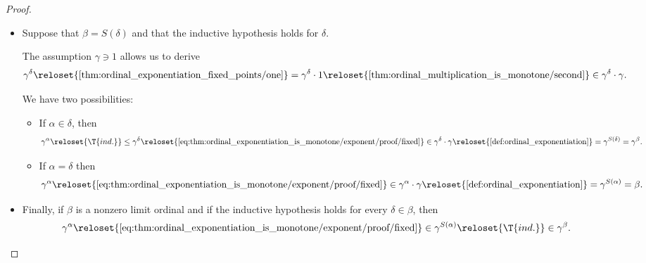 \begin{proof}
\begin{itemize}
    \item Suppose that \( \beta = S(\delta) \) and that the inductive hypothesis holds for \( \delta \).

    The assumption \( \gamma \ni 1 \) allows us to derive
    \begin{equation}\label{eq:thm:ordinal_exponentiation_is_monotone/exponent/proof/fixed}
      \gamma^\delta
      \reloset {\ref{thm:ordinal_exponentiation_fixed_points/one}} =
      \gamma^\delta \cdot 1
      \reloset {\ref{thm:ordinal_multiplication_is_monotone/second}} \in
      \gamma^\delta \cdot \gamma.
    \end{equation}

    We have two possibilities:
    \begin{itemize}
      \item If \( \alpha \in \delta \), then
      \begin{equation*}
        \gamma^\alpha
        \reloset {\T{ind.}} \leq
        \gamma^\delta
        \reloset {\ref{eq:thm:ordinal_exponentiation_is_monotone/exponent/proof/fixed}} \in
        \gamma^\delta \cdot \gamma
        \reloset {\ref{def:ordinal_exponentiation}} =
        \gamma^{S(\delta)}
        =
        \gamma^\beta.
      \end{equation*}

      \item If \( \alpha = \delta \) then
      \begin{equation*}
        \gamma^\alpha
        \reloset {\ref{eq:thm:ordinal_exponentiation_is_monotone/exponent/proof/fixed}} \in
        \gamma^\alpha \cdot \gamma
        \reloset {\ref{def:ordinal_exponentiation}} =
        \gamma^{S(\alpha)}
        =
        \beta.
      \end{equation*}
    \end{itemize}

    \item Finally, if \( \beta \) is a nonzero limit ordinal and if the inductive hypothesis holds for every \( \delta \in \beta \), then
    \begin{equation*}
      \gamma^\alpha
      \reloset {\ref{eq:thm:ordinal_exponentiation_is_monotone/exponent/proof/fixed}} \in
      \gamma^{S(\alpha)}
      \reloset {\T{ind.}} \in
      \gamma^\beta.
    \end{equation*}
  \end{itemize}
\end{proof}

